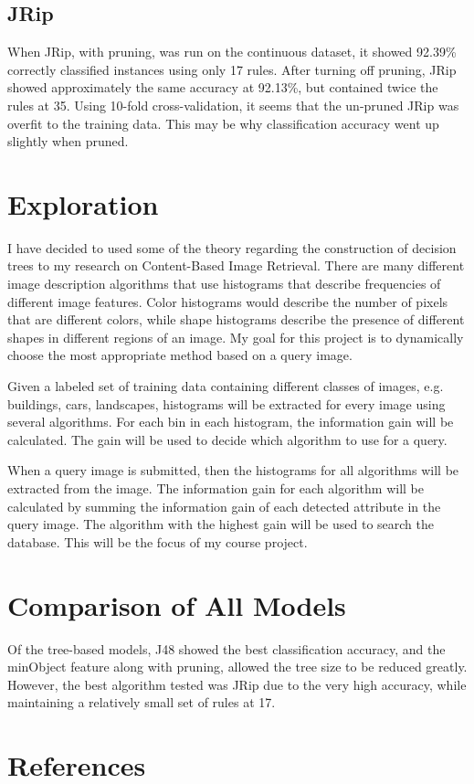 \documentclass[11pt]{article}
\begin{document}
\subsection{JRip}
When JRip, with pruning, was run on the continuous dataset, it showed 92.39\% correctly classified instances using only 17 rules. After turning off pruning, JRip showed approximately the same accuracy at 92.13\%, but contained twice the rules at 35. Using 10-fold cross-validation, it seems that the un-pruned JRip was overfit to the training data. This may be why classification accuracy went up slightly when pruned.
\section{Exploration}
I have decided to used some of the theory regarding the construction of decision trees to my research on Content-Based Image Retrieval. There are many different image description algorithms that use histograms that describe frequencies of different image features. Color histograms would describe the number of pixels that are different colors, while shape histograms describe the presence of different shapes in different regions of an image. My goal for this project is to dynamically choose the most appropriate method based on a query image. 

Given a labeled set of training data containing different classes of images, e.g. buildings, cars, landscapes, histograms will be extracted for every image using several algorithms. For each bin in each histogram, the information gain will be calculated. The gain will be used to decide which algorithm to use for a query.

When a query image is submitted, then the histograms for all algorithms will be extracted from the image. The information gain for each algorithm will be calculated by summing the information gain of each detected attribute in the query image. The algorithm with the highest gain will be used to search the database. This will be the focus of my course project.
\section{Comparison of All Models}
Of the tree-based models, J48 showed the best classification accuracy, and the minObject feature along with pruning, allowed the tree size to be reduced greatly. However, the best algorithm tested was JRip due to the very high accuracy, while maintaining a relatively small set of rules at 17.
\section{References}



\end{document}
